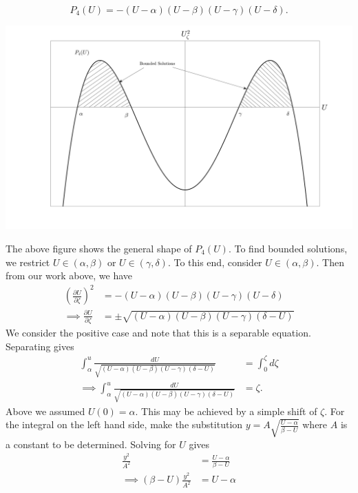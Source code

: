 \documentclass{article}
\begin{document}
\begin{itemize}
\begin{itemize}
        \[P_4(U) = -(U-\alpha)(U-\beta)(U-\gamma)(U - \delta).\]
        \begin{center}
            \includegraphics[scale = 0.2]{P4_nlw.png}
        \end{center}
        The above figure shows the general shape of $P_4(U)$. To find bounded solutions, we restrict $U \in (\alpha, \beta)$ or $U \in(\gamma, \delta)$. To this end, consider $U\in (\alpha,\beta)$. Then from our work above, we have
        \begin{align*}
            \left(\frac{\partial U}{\partial \zeta}\right)^2 &= -(U-\alpha)(U-\beta)(U-\gamma)(U-\delta)\\
            \implies \frac{\partial U}{\partial \zeta} &= \pm\sqrt{(U-\alpha)(U-\beta)(U-\gamma)(\delta-U)}
        \end{align*}
        We consider the positive case and note that this is a separable equation. Separating gives
        \begin{align*}
            \int_{\alpha}^{u}\frac{dU}{\sqrt{(U-\alpha)(U-\beta)(U-\gamma)(\delta - U)}} &= \int_{0}^{\zeta} d\zeta\\
            \implies \int_{\alpha}^{u}\frac{dU}{\sqrt{(U-\alpha)(U-\beta)(U-\gamma)(\delta - U)}} &= \zeta.
        \end{align*}
        Above we assumed $U(0) = \alpha$. This may be achieved by a simple shift of $\zeta$.
        For the integral on the left hand side, make the substitution $y = A\sqrt{\frac{U - \alpha}{\beta - U}}$ where $A$ is a constant to be determined. Solving for $U$ gives
        \begin{align*}
            \frac{y^2}{A^2} &= \frac{U - \alpha}{\beta - U}\\
            \implies (\beta - U)\frac{y^2}{A^2} &= U- \alpha\\

\end{align*}
\end{itemize}
\end{itemize}
\end{document}
